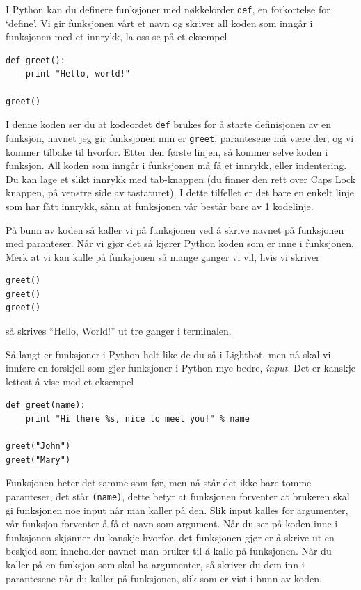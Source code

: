 \documentclass[a4paper, 11pt, notitlepage]{article}
\begin{document}
I Python kan du definere funksjoner med nøkkelorder \verb+def+, en forkortelse for `define'. Vi gir funksjonen vårt et navn og skriver all koden som inngår i funksjonen med et innrykk, la oss se på et eksempel
\begin{lstlisting}
def greet():
	print "Hello, world!"

greet()
\end{lstlisting}
I denne koden ser du at kodeordet \verb+def+ brukes for å starte definisjonen av en funksjon, navnet jeg gir funksjonen min er \verb+greet+, parantesene må være der, og vi kommer tilbake til hvorfor. Etter den første linjen, så kommer selve koden i funksjon. All koden som inngår i funksjonen må få et innrykk, eller indentering. Du kan lage et slikt innrykk med tab-knappen (du finner den rett over Caps Lock knappen, på venstre side av tastaturet). I dette tilfellet er det bare en enkelt linje som har fått innrykk, sånn at funksjonen vår består bare av 1 kodelinje.

På bunn av koden så kaller vi på funksjonen ved å skrive navnet på funksjonen med paranteser. Når vi gjør det så kjører Python koden som er inne i funksjonen. Merk at vi kan kalle på funksjonen så mange ganger vi vil, hvis vi skriver
\begin{lstlisting}
greet()
greet()
greet()
\end{lstlisting}
så skrives ``Hello, World!'' ut tre ganger i terminalen.

Så langt er funksjoner i Python helt like de du så i Lightbot, men nå skal vi innføre en forskjell som gjør funksjoner i Python mye bedre, \emph{input}. Det er kanskje lettest å vise med et eksempel
\begin{lstlisting}
def greet(name):
	print "Hi there %s, nice to meet you!" % name

greet("John")
greet("Mary")
\end{lstlisting}
Funksjonen heter det samme som før, men nå står det ikke bare tomme paranteser, det står \verb+(name)+, dette betyr at funksjonen forventer at brukeren skal gi funksjonen noe input når man kaller på den. Slik input kalles for argumenter, vår funksjon forventer å få et navn som argument. Når du ser på koden inne i funksjonen skjønner du kanskje hvorfor, det funksjonen gjør er å skrive ut en beskjed som inneholder navnet man bruker til å kalle på funksjonen. Når du kaller på en funksjon som skal ha argumenter, så skriver du dem inn i parantesene når du kaller på funksjonen, slik som er vist i bunn av koden.
\end{document}
